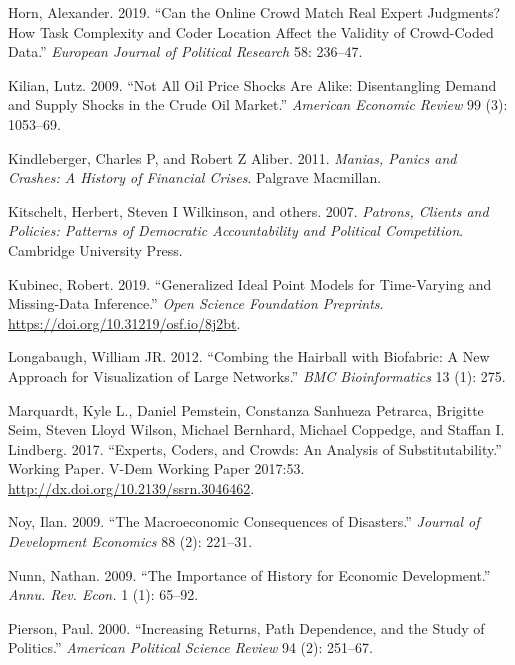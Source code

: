 \documentclass[]{article}
\begin{document}
\leavevmode\hypertarget{ref-Horn2019}{}%
Horn, Alexander. 2019. ``Can the Online Crowd Match Real Expert Judgments? How Task Complexity and Coder Location Affect the Validity of Crowd-Coded Data.'' \emph{European Journal of Political Research} 58: 236--47.

\leavevmode\hypertarget{ref-kilian2009not}{}%
Kilian, Lutz. 2009. ``Not All Oil Price Shocks Are Alike: Disentangling Demand and Supply Shocks in the Crude Oil Market.'' \emph{American Economic Review} 99 (3): 1053--69.

\leavevmode\hypertarget{ref-kindleberger2011manias}{}%
Kindleberger, Charles P, and Robert Z Aliber. 2011. \emph{Manias, Panics and Crashes: A History of Financial Crises}. Palgrave Macmillan.

\leavevmode\hypertarget{ref-kitschelt2007patrons}{}%
Kitschelt, Herbert, Steven I Wilkinson, and others. 2007. \emph{Patrons, Clients and Policies: Patterns of Democratic Accountability and Political Competition}. Cambridge University Press.

\leavevmode\hypertarget{ref-kubinec2019ideal}{}%
Kubinec, Robert. 2019. ``Generalized Ideal Point Models for Time-Varying and Missing-Data Inference.'' \emph{Open Science Foundation Preprints}. \url{https://doi.org/10.31219/osf.io/8j2bt}.

\leavevmode\hypertarget{ref-longabaugh2012}{}%
Longabaugh, William JR. 2012. ``Combing the Hairball with Biofabric: A New Approach for Visualization of Large Networks.'' \emph{BMC Bioinformatics} 13 (1): 275.

\leavevmode\hypertarget{ref-marquardtetal2017}{}%
Marquardt, Kyle L., Daniel Pemstein, Constanza Sanhueza Petrarca, Brigitte Seim, Steven Lloyd Wilson, Michael Bernhard, Michael Coppedge, and Staffan I. Lindberg. 2017. ``Experts, Coders, and Crowds: An Analysis of Substitutability.'' Working Paper. V-Dem Working Paper 2017:53. \url{http://dx.doi.org/10.2139/ssrn.3046462}.

\leavevmode\hypertarget{ref-noy2009macroeconomic}{}%
Noy, Ilan. 2009. ``The Macroeconomic Consequences of Disasters.'' \emph{Journal of Development Economics} 88 (2): 221--31.

\leavevmode\hypertarget{ref-nunn2009importance}{}%
Nunn, Nathan. 2009. ``The Importance of History for Economic Development.'' \emph{Annu. Rev. Econ.} 1 (1): 65--92.

\leavevmode\hypertarget{ref-pierson2000increasing}{}%
Pierson, Paul. 2000. ``Increasing Returns, Path Dependence, and the Study of Politics.'' \emph{American Political Science Review} 94 (2): 251--67.
\end{document}
